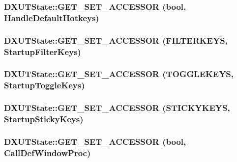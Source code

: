\label{class_d_x_u_t_state_a981afeeb5288f87cb108aea494aeb8b1}
\hypertarget{class_d_x_u_t_state_a6b7b328201a569abda3170002bdf4425}{
\subsubsection[{GET\_\-SET\_\-ACCESSOR}]{\setlength{\rightskip}{0pt plus 5cm}DXUTState::GET\_\-SET\_\-ACCESSOR (bool, \/  HandleDefaultHotkeys)}}
\label{class_d_x_u_t_state_a6b7b328201a569abda3170002bdf4425}
\hypertarget{class_d_x_u_t_state_adb16f4a32a8c334efa700d236c4b3f1f}{
\subsubsection[{GET\_\-SET\_\-ACCESSOR}]{\setlength{\rightskip}{0pt plus 5cm}DXUTState::GET\_\-SET\_\-ACCESSOR (FILTERKEYS, \/  StartupFilterKeys)}}
\label{class_d_x_u_t_state_adb16f4a32a8c334efa700d236c4b3f1f}
\hypertarget{class_d_x_u_t_state_a2a538af499891a9dca7af0a597c969a7}{
\subsubsection[{GET\_\-SET\_\-ACCESSOR}]{\setlength{\rightskip}{0pt plus 5cm}DXUTState::GET\_\-SET\_\-ACCESSOR (TOGGLEKEYS, \/  StartupToggleKeys)}}
\label{class_d_x_u_t_state_a2a538af499891a9dca7af0a597c969a7}
\hypertarget{class_d_x_u_t_state_ad8ae97695fda015e78fcdf3538f368e7}{
\subsubsection[{GET\_\-SET\_\-ACCESSOR}]{\setlength{\rightskip}{0pt plus 5cm}DXUTState::GET\_\-SET\_\-ACCESSOR (STICKYKEYS, \/  StartupStickyKeys)}}
\label{class_d_x_u_t_state_ad8ae97695fda015e78fcdf3538f368e7}
\hypertarget{class_d_x_u_t_state_a88270222bc6d87a610b94309d35a5d4c}{
\subsubsection[{GET\_\-SET\_\-ACCESSOR}]{\setlength{\rightskip}{0pt plus 5cm}DXUTState::GET\_\-SET\_\-ACCESSOR (bool, \/  CallDefWindowProc)}}
